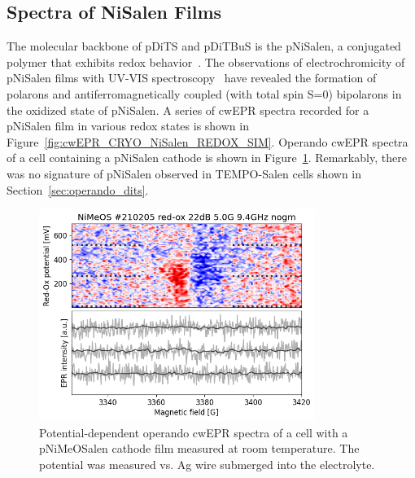 \subsection{Spectra of NiSalen Films}
The molecular backbone of pDiTS and pDiTBuS is the pNiSalen, a conjugated polymer that exhibits redox behavior~\cite{Dmitrieva2018,Vereshchagin2020,Apraksin2021}. The observations of electrochromicity of pNiSalen films with UV-VIS spectroscopy~\cite{Dmitrieva2018} have revealed the formation of polarons and antiferromagnetically coupled (with total spin S=0) bipolarons in the oxidized state of pNiSalen. A series of cwEPR spectra recorded for a pNiSalen film in various redox states is shown in Figure~\ref{fig:cwEPR_CRYO_NiSalen_REDOX_SIM}. Operando cwEPR spectra of a cell containing a pNiSalen cathode is shown in Figure~\ref{fig:cwEPR_RT_NiSalen_OPERANDO}. Remarkably, there was no signature of pNiSalen observed in TEMPO-Salen cells shown in Section~\ref{sec:operando_dits}.
\begin{figure}[H]
\center
	\includegraphics[width=0.8\textwidth]{./operando_epr/figures/backbone/NiMeOS_lyra_overnight_RT.png}
	\caption{Potential-dependent operando cwEPR spectra of a cell with a pNiMeOSalen cathode film measured at room temperature. The potential was measured vs. Ag wire submerged into the electrolyte.}
	\label{fig:cwEPR_RT_NiSalen_OPERANDO}
\end{figure}
\newpage
